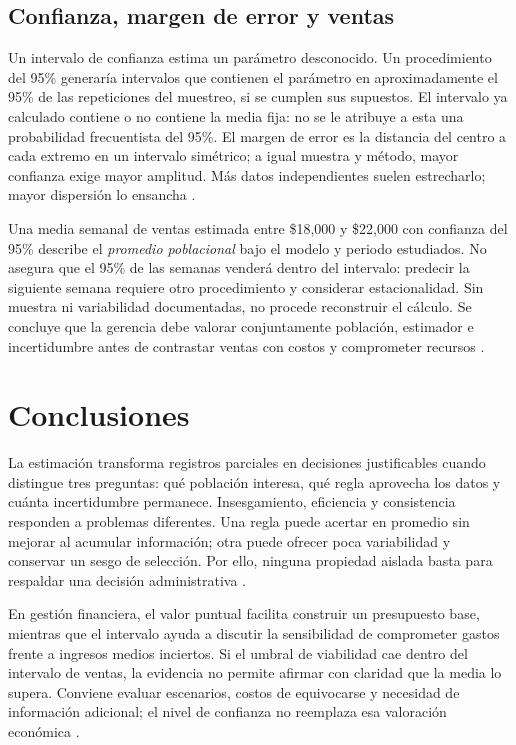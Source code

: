 {\subsection{Confianza, margen de error y ventas}
Un intervalo de confianza estima un parámetro desconocido. Un procedimiento del 95\% generaría intervalos que contienen el parámetro en aproximadamente el 95\% de las repeticiones del muestreo, si se cumplen sus supuestos. El intervalo ya calculado contiene o no contiene la media fija: no se le atribuye a esta una probabilidad frecuentista del 95\%. El margen de error es la distancia del centro a cada extremo en un intervalo simétrico; a igual muestra y método, mayor confianza exige mayor amplitud. Más datos independientes suelen estrecharlo; mayor dispersión lo ensancha \citep{nistHandbook}.

Una media semanal de ventas estimada entre \$18,000 y \$22,000 con confianza del 95\% describe el \textit{promedio poblacional} bajo el modelo y periodo estudiados. No asegura que el 95\% de las semanas venderá dentro del intervalo: predecir la siguiente semana requiere otro procedimiento y considerar estacionalidad. Sin muestra ni variabilidad documentadas, no procede reconstruir el cálculo. Se concluye que la gerencia debe valorar conjuntamente población, estimador e incertidumbre antes de contrastar ventas con costos y comprometer recursos \citep{nistHandbook}.

\section{Conclusiones}
La estimación transforma registros parciales en decisiones justificables cuando distingue tres preguntas: qué población interesa, qué regla aprovecha los datos y cuánta incertidumbre permanece. Insesgamiento, eficiencia y consistencia responden a problemas diferentes. Una regla puede acertar en promedio sin mejorar al acumular información; otra puede ofrecer poca variabilidad y conservar un sesgo de selección. Por ello, ninguna propiedad aislada basta para respaldar una decisión administrativa \citep{holmesBusiness2023,bradley2021}.

En gestión financiera, el valor puntual facilita construir un presupuesto base, mientras que el intervalo ayuda a discutir la sensibilidad de comprometer gastos frente a ingresos medios inciertos. Si el umbral de viabilidad cae dentro del intervalo de ventas, la evidencia no permite afirmar con claridad que la media lo supera. Conviene evaluar escenarios, costos de equivocarse y necesidad de información adicional; el nivel de confianza no reemplaza esa valoración económica \citep{nistHandbook}.

}
